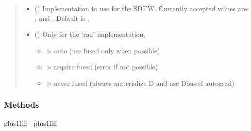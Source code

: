 \documentclass[letterpaper,10pt,english]{sphinxmanual}
\begin{document}
\begin{fulllineitems}
\begin{quote}
\begin{description}
\begin{itemize}
\item {} 
\sphinxAtStartPar
{} (\sphinxstyleliteralemphasis{\sphinxupquote{, }}) \textendash{} Implementation to use for the SDTW. Currently accepted values are ,  and . Default is .

\item {} 
\sphinxAtStartPar
{} (\sphinxstyleliteralemphasis{\sphinxupquote{, }}) \textendash{} 
\sphinxAtStartPar
Only for the ‘ron’ implementation.
\begin{itemize}
\item {} 
\sphinxAtStartPar
{}  \sphinxhyphen{}\textgreater{} auto (use fused only when possible)

\item {} 
\sphinxAtStartPar
{}  \sphinxhyphen{}\textgreater{} require fused (error if not possible)

\item {} 
\sphinxAtStartPar
{} \sphinxhyphen{}\textgreater{} never fused (always materialize D and use D\sphinxhyphen{}based autograd)

\end{itemize}


\end{itemize}

\end{description}\end{quote}
\subsubsection*{Methods}


\begin{savenotes}
\sphinxatlongtablestart
\sphinxthistablewithglobalstyle
\sphinxthistablewithnovlinesstyle
\makeatletter
  \LTleft \@totalleftmargin plus1fill
  \LTright\dimexpr\columnwidth-\@totalleftmargin-\linewidth\relax plus1fill
\makeatother
\begin{longtable}{}
\sphinxtoprule
\endfirsthead

\\
\sphinxtoprule
\endhead


\end{longtable}
\end{savenotes}
\end{fulllineitems}
\end{document}
